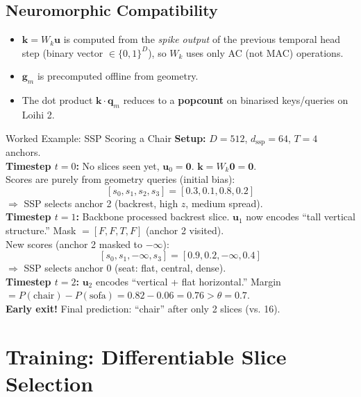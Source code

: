 \documentclass[11pt,a4paper]{article}
\begin{document}
\subsection{Neuromorphic Compatibility}

\begin{itemize}
  \item $\mathbf{k} = W_k \mathbf{u}$ is computed from the \emph{spike output}
    of the previous temporal head step (binary vector $\in \{0,1\}^D$), so
    $W_k$ uses only AC (not MAC) operations.
  \item $\mathbf{g}_m$ is precomputed offline from geometry.
  \item The dot product $\mathbf{k} \cdot \mathbf{q}_m$ reduces to a
    \textbf{popcount} on binarised keys/queries on Loihi 2.
\end{itemize}

\begin{examplebox}{Worked Example: SSP Scoring a Chair}
\textbf{Setup:} $D=512$, $d_\text{ssp}=64$, $T=4$ anchors.\\[4pt]
\textbf{Timestep $t=0$:} No slices seen yet, $\mathbf{u}_0 = \mathbf{0}$.
$\mathbf{k} = W_k \mathbf{0} = \mathbf{0}$.\\
Scores are purely from geometry queries (initial bias):
\[
  [s_0, s_1, s_2, s_3] = [0.3, 0.1, 0.8, 0.2]
\]
$\Rightarrow$ SSP selects anchor 2 (backrest, high $z$, medium spread).\\[6pt]

\textbf{Timestep $t=1$:} Backbone processed backrest slice.
$\mathbf{u}_1$ now encodes ``tall vertical structure.''
Mask $= [F, F, T, F]$ (anchor 2 visited).\\
New scores (anchor 2 masked to $-\infty$):
\[
  [s_0, s_1, -\infty, s_3] = [0.9, 0.2, -\infty, 0.4]
\]
$\Rightarrow$ SSP selects anchor 0 (seat: flat, central, dense).\\[6pt]

\textbf{Timestep $t=2$:} $\mathbf{u}_2$ encodes ``vertical + flat horizontal.''
Margin $= P(\text{chair}) - P(\text{sofa}) = 0.82 - 0.06 = 0.76 > \theta = 0.7$.\\
\textbf{Early exit!} Final prediction: ``chair'' after only 2 slices (vs. 16).
\end{examplebox}

\section{Training: Differentiable Slice Selection}
\end{document}
